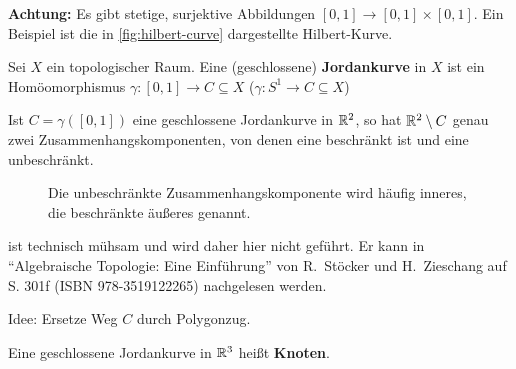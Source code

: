 \textbf{Achtung:} Es gibt stetige, surjektive Abbildungen 
    $[0,1] \rightarrow [0,1] \times [0,1]$. Ein Beispiel ist die
    in \cref{fig:hilbert-curve} dargestellte Hilbert-Kurve.
    
    

\begin{definition}
    Sei $X$ ein topologischer Raum. Eine (geschlossene)
    \textbf{Jordankurve} in $X$ ist ein Homöomorphismus 
    $\gamma: [0, 1] \rightarrow C \subseteq X$
    ($\gamma: S^1 \rightarrow C \subseteq X$)
\end{definition}

\begin{satz}
    Ist $C=\gamma([0,1])$ eine geschlossene Jordankurve in $\mathbb{R}^2$,
    so hat $\mathbb{R}^2 \setminus C$ genau zwei Zusammenhangskomponenten,
    von denen eine beschränkt ist und eine unbeschränkt.
\end{satz}

\begin{figure}[htp]
    \centering
     
    \label{fig:jordan-kurvensatz}
    \caption{Die unbeschränkte Zusammenhangskomponente wird häufig inneres, die beschränkte äußeres genannt.}
\end{figure}

\begin{beweis}
    ist technisch mühsam und wird daher hier nicht geführt. Er kann
    in \enquote{Algebraische Topologie: Eine Einführung} von R.~Stöcker
    und H.~Zieschang auf S. 301f (ISBN 978-3519122265) nachgelesen werden.

    Idee: Ersetze Weg $C$ durch Polygonzug.
\end{beweis}

\begin{definition}
    Eine geschlossene Jordankurve in $\mathbb{R}^3$ heißt \textbf{Knoten}.
\end{definition}

